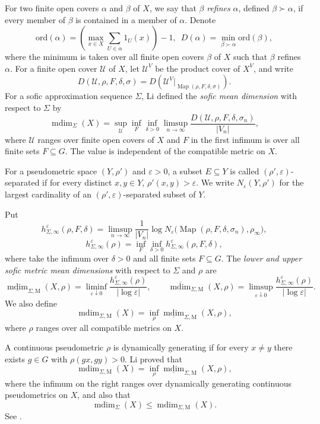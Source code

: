 \documentclass[12pt,a4paper]{amsart}
\theoremstyle{definition}
\newcommand{\mdim}{\operatorname{mdim}}
\newcommand{\Map}{\operatorname{Map}}
\newcommand{\cU}{\mathcal U}
\begin{document}
	
For two finite open covers $\alpha$ and $\beta$ of $X$, we say that $\beta$ \emph{refines} $\alpha$, defined $\beta \succ \alpha$, if every member of $\beta$ is contained in a member of $\alpha$.
Denote
	\[
	\mathrm{ord}(\alpha) = \left( \max_{x \in X} \sum_{U \in \alpha} 1_U(x) \right) - 1\text{,~~}
	D(\alpha) = \min_{\beta \succ \alpha} \mathrm{ord}(\beta),
	\]
	where the minimum is taken over all finite open covers $\beta$ of $X$ such that $\beta$  refines $\alpha$.
    For a finite open cover $\cU$ of $X$, let $\cU^V$ be the product cover of $X^V$, and write
	\[
	D(\cU,\rho,F,\delta,\sigma)
	=D\left(\cU^V|_{\Map(\rho,F,\delta,\sigma)}\right).
	\]
	For a sofic approximation sequence $\Sigma$,  Li \cite{Li13} defined the \emph{sofic mean dimension} with respect to $\Sigma$ by
	\[
	\mdim_\Sigma(X)
	=\sup_{\cU}\inf_F\inf_{\delta>0}
	\limsup_{n\to\infty}
	\frac{D(\cU,\rho,F,\delta,\sigma_n)}{|V_n|},
	\]
	where $\cU$ ranges over finite open covers of $X$ and $F$ in the first infimum is over all finite sets $F \subseteq G$. The value is independent of the compatible metric on $X$.
    
	For a pseudometric space $(Y,\rho')$ and $\varepsilon>0$, a subset $E\subseteq Y$ is called $(\rho',\varepsilon)$-separated if for every distinct $x,y\in Y$,  $\rho'(x,y)>\varepsilon$. We write
$N_\varepsilon(Y,\rho')$
for the largest cardinality of an $(\rho',\varepsilon)$-separated subset of $Y$.

	 Put
	\[
	h^\varepsilon_{\Sigma,\infty}(\rho,F,\delta)
	=\limsup_{n\to\infty}\frac1{|V_n|}
	\log N_\varepsilon\bigl(\Map(\rho,F,\delta,\sigma_n),\rho_\infty\bigr),
	\]
    \[h^\varepsilon_{\Sigma,\infty}(\rho)=\inf_{F}\inf_{\delta>0}h^\varepsilon_{\Sigma,\infty}(\rho,F,\delta),
    \]
	where take the infimum over $\delta>0$ and all finite sets $F \subseteq G$.  The \emph{lower and upper sofic metric mean dimensions} with respect to $\Sigma$ and $\rho$ are
	\[
	\underline{\mdim}_{\Sigma,\mathrm M}(X,\rho)
	=\liminf_{\varepsilon\downarrow0}
	\frac{h^\varepsilon_{\Sigma,\infty}(\rho)}{|\log\varepsilon|},
	\qquad
	\overline{\mdim}_{\Sigma,\mathrm M}(X,\rho)
	=\limsup_{\varepsilon\downarrow0}
	\frac{h^\varepsilon_{\Sigma,\infty}(\rho)}{|\log\varepsilon|}.
	\]
	We also define
	\[
	\mdim_{\Sigma,\mathrm M}(X)
	=\inf_{\rho}\underline{\mdim}_{\Sigma,\mathrm M}(X,\rho),
	\]
	where $\rho$ ranges over all compatible metrics on $X$.
	
	A continuous pseudometric $\rho$ is dynamically generating if for every $x\ne y$ there exists $g\in G$ with $\rho(gx,gy)>0$.  Li proved that
	\begin{equation}\label{eq:metric-inf-dyn}
		\mdim_{\Sigma,\mathrm M}(X)
		=\inf_{\rho}\underline{\mdim}_{\Sigma,\mathrm M}(X,\rho),
	\end{equation}
	where the infimum on the right ranges over dynamically generating continuous pseudometrics on $X$, and also that
	\begin{equation}\label{eq:comparison}
		\mdim_\Sigma(X)\le \mdim_{\Sigma,\mathrm M}(X).
	\end{equation}
	See \cite[Lemma 4.4, Proposition 4.5 and Section 6]{Li13}.
    
\end{document}

